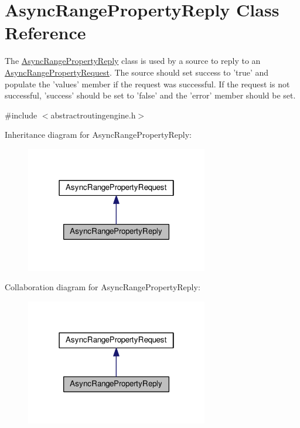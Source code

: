 \hypertarget{classAsyncRangePropertyReply}{\section{Async\+Range\+Property\+Reply Class Reference}
\label{classAsyncRangePropertyReply}
}


The \hyperlink{classAsyncRangePropertyReply}{Async\+Range\+Property\+Reply} class is used by a source to reply to an \hyperlink{classAsyncRangePropertyRequest}{Async\+Range\+Property\+Request}. The source should set success to 'true' and populate the 'values' member if the request was successful. If the request is not successful, 'success' should be set to 'false' and the 'error' member should be set.  




{\ttfamily \#include $<$abstractroutingengine.\+h$>$}



Inheritance diagram for Async\+Range\+Property\+Reply\+:\nopagebreak
\begin{figure}[H]
\begin{center}
\leavevmode
\includegraphics[width=226pt]{classAsyncRangePropertyReply__inherit__graph}
\end{center}
\end{figure}


Collaboration diagram for Async\+Range\+Property\+Reply\+:\nopagebreak
\begin{figure}[H]
\begin{center}
\leavevmode
\includegraphics[width=226pt]{classAsyncRangePropertyReply__coll__graph}
\end{center}
\end{figure}
